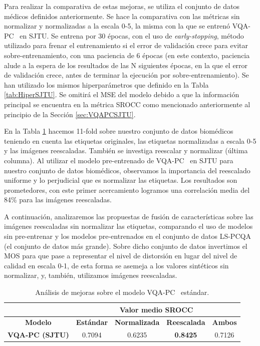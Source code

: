 Para realizar la comparativa de estas mejoras, se utiliza el conjunto de datos 
médicos definidos anteriormente. Se hace la comparativa con las métricas sin 
normalizar y normalizadas a la escala 0-5, la misma con la que se entrenó VQA-PC~\cite{VQA-PC} en SJTU. 
Se entrena por 30 épocas, con el uso de \emph{early-stopping}, método utilizado para frenar el entrenamiento 
si el error de validación crece para evitar sobre-entrenamiento, con una paciencia 
de 6 épocas (en este contexto, paciencia alude a la espera de los resultados de 
las N siguientes épocas, en la que el error de validación crece, antes de terminar 
la ejecución por sobre-entrenamiento). 
Se han utilizado los mismos hiperparámetros que definido en la Tabla \ref{tab:HiperSJTU}.
Se omitirá el MSE del modelo debido a que la información principal se encuentra 
en la métrica SROCC como mencionado anteriormente al principio de la Sección \ref{sec:VQAPCSJTU}.

En la Tabla \ref{tab:Reescalado} hacemos 11-fold sobre nuestro conjunto de datos 
biomédicos teniendo en cuenta las etiquetas originales, las etiquetas
normalizadas a escala 0-5 y las imágenes reescaladas. También se investiga reescalar y normalizar (última columna).
Al utilizar el modelo pre-entrenado de VQA-PC~\cite{VQA-PC} en SJTU para 
nuestro conjunto de datos biomédicos, observamos la importancia del reescalado 
uniforme y lo perjudicial que es normalizar las etiquetas.  
Los resultados son prometedores, con este primer acercamiento logramos una 
correlación media del 84\% para las imágenes reescaladas. 

A continuación, 
analizaremos las propuestas de fusión de características sobre las imágenes 
reescaladas sin normalizar las etiquetas, 
comparando el uso de modelos sin pre-entrenar y los modelos pre-entrenados 
en el conjunto de datos LS-PCQA~\cite{ResSCNN} (el conjunto de datos más grande). 
Sobre dicho conjunto de datos invertimos el MOS para que pase a representar el nivel 
de distorsión en lugar del nivel de calidad en escala 0-1, de esta forma se 
asemeja a los valores sintéticos sin normalizar, y, también, utilizamos 
imágenes reescaladas.

\begin{table}[htp]
  \scriptsize
  \centering
\begin{tabular}{|c|cccc|}
\hline
\rowcolor[HTML]{FFC702}
                       & \multicolumn{4}{c|}{\textbf{Valor medio SROCC}}                                                                                                    \\ \hline
\rowcolor[HTML]{FFC702}
\textbf{Modelo}        & \multicolumn{1}{c|}{\textbf{Estándar}} & \multicolumn{1}{c|}{\textbf{Normalizada}} & \multicolumn{1}{c|}{\textbf{Reescalada}} & \textbf{Ambos}  \\ \hline
\textbf{VQA-PC (SJTU)} & \multicolumn{1}{c|}{0.7094}            & \multicolumn{1}{c|}{0.6235}      & \multicolumn{1}{c|}{\textbf{0.8425}}    & 0.7126          \\ \hline
\end{tabular}
\caption[Análisis de mejoras sobre el modelo VQA-PC estándar.]{
  Análisis de mejoras sobre el modelo VQA-PC~\cite{VQA-PC} estándar.
}
\label{tab:Reescalado}
\end{table}


